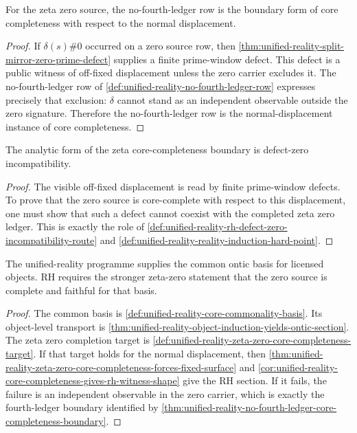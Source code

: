 \begin{theorem}
\label{thm:unified-reality-no-fourth-ledger-core-completeness-boundary}
For the zeta zero source, the no-fourth-ledger row is the boundary form
of core completeness with respect to the normal displacement.
\end{theorem}

\begin{proof}
If $\delta(s)\#0$ occurred on a zero source row, then
\autoref{thm:unified-reality-split-mirror-zero-prime-defect} supplies a
finite prime-window defect.  This defect is a public witness of
off-fixed displacement unless the zero carrier excludes it.  The
no-fourth-ledger row of
\autoref{def:unified-reality-no-fourth-ledger-row} expresses precisely
that exclusion: $\delta$ cannot stand as an independent observable
outside the zero signature.  Therefore the no-fourth-ledger row is the
normal-displacement instance of core completeness.
\end{proof}

\begin{corollary}
\label{cor:unified-reality-defect-zero-incompatibility-analytic-form}
The analytic form of the zeta core-completeness boundary is
defect-zero incompatibility.
\end{corollary}

\begin{proof}
The visible off-fixed displacement is read by finite prime-window
defects.  To prove that the zero source is core-complete with respect to
this displacement, one must show that such a defect cannot coexist with
the completed zeta zero ledger.  This is exactly the role of
\autoref{def:unified-reality-rh-defect-zero-incompatibility-route} and
\autoref{def:unified-reality-reality-induction-hard-point}.
\end{proof}

\begin{theorem}
\label{thm:unified-reality-core-commonality-completion-principle}
The unified-reality programme supplies the common ontic basis for
licensed objects.  RH requires the stronger zeta-zero statement that the
zero source is complete and faithful for that basis.
\end{theorem}

\begin{proof}
The common basis is
\autoref{def:unified-reality-core-commonality-basis}.  Its object-level
transport is
\autoref{thm:unified-reality-object-induction-yields-ontic-section}.
The zeta zero completion target is
\autoref{def:unified-reality-zeta-zero-core-completeness-target}.  If
that target holds for the normal displacement, then
\autoref{thm:unified-reality-zeta-zero-core-completeness-forces-fixed-surface}
and
\autoref{cor:unified-reality-core-completeness-gives-rh-witness-shape}
give the RH section.  If it fails, the failure is an independent
observable in the zero carrier, which is exactly the fourth-ledger
boundary identified by
\autoref{thm:unified-reality-no-fourth-ledger-core-completeness-boundary}.
\end{proof}

